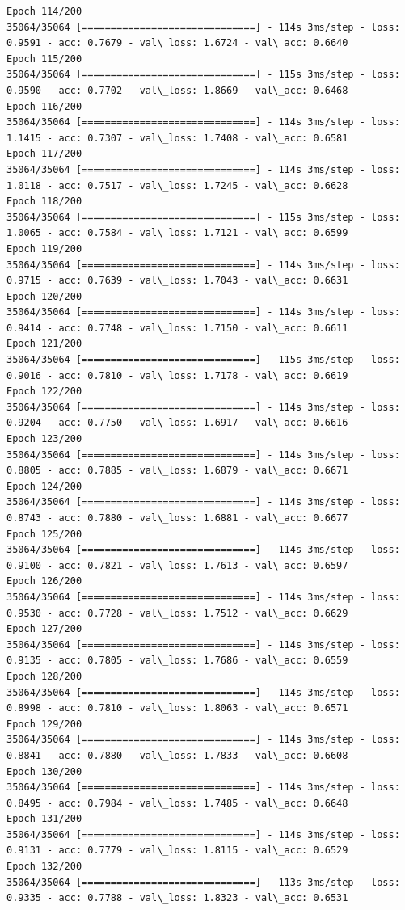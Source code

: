 \documentclass[11pt]{article}
\begin{document}
\begin{Verbatim}[commandchars=\\\{\}]
Epoch 114/200
35064/35064 [==============================] - 114s 3ms/step - loss: 0.9591 - acc: 0.7679 - val\_loss: 1.6724 - val\_acc: 0.6640
Epoch 115/200
35064/35064 [==============================] - 115s 3ms/step - loss: 0.9590 - acc: 0.7702 - val\_loss: 1.8669 - val\_acc: 0.6468
Epoch 116/200
35064/35064 [==============================] - 114s 3ms/step - loss: 1.1415 - acc: 0.7307 - val\_loss: 1.7408 - val\_acc: 0.6581
Epoch 117/200
35064/35064 [==============================] - 114s 3ms/step - loss: 1.0118 - acc: 0.7517 - val\_loss: 1.7245 - val\_acc: 0.6628
Epoch 118/200
35064/35064 [==============================] - 115s 3ms/step - loss: 1.0065 - acc: 0.7584 - val\_loss: 1.7121 - val\_acc: 0.6599
Epoch 119/200
35064/35064 [==============================] - 114s 3ms/step - loss: 0.9715 - acc: 0.7639 - val\_loss: 1.7043 - val\_acc: 0.6631
Epoch 120/200
35064/35064 [==============================] - 114s 3ms/step - loss: 0.9414 - acc: 0.7748 - val\_loss: 1.7150 - val\_acc: 0.6611
Epoch 121/200
35064/35064 [==============================] - 115s 3ms/step - loss: 0.9016 - acc: 0.7810 - val\_loss: 1.7178 - val\_acc: 0.6619
Epoch 122/200
35064/35064 [==============================] - 114s 3ms/step - loss: 0.9204 - acc: 0.7750 - val\_loss: 1.6917 - val\_acc: 0.6616
Epoch 123/200
35064/35064 [==============================] - 114s 3ms/step - loss: 0.8805 - acc: 0.7885 - val\_loss: 1.6879 - val\_acc: 0.6671
Epoch 124/200
35064/35064 [==============================] - 114s 3ms/step - loss: 0.8743 - acc: 0.7880 - val\_loss: 1.6881 - val\_acc: 0.6677
Epoch 125/200
35064/35064 [==============================] - 114s 3ms/step - loss: 0.9100 - acc: 0.7821 - val\_loss: 1.7613 - val\_acc: 0.6597
Epoch 126/200
35064/35064 [==============================] - 114s 3ms/step - loss: 0.9530 - acc: 0.7728 - val\_loss: 1.7512 - val\_acc: 0.6629
Epoch 127/200
35064/35064 [==============================] - 114s 3ms/step - loss: 0.9135 - acc: 0.7805 - val\_loss: 1.7686 - val\_acc: 0.6559
Epoch 128/200
35064/35064 [==============================] - 114s 3ms/step - loss: 0.8998 - acc: 0.7810 - val\_loss: 1.8063 - val\_acc: 0.6571
Epoch 129/200
35064/35064 [==============================] - 114s 3ms/step - loss: 0.8841 - acc: 0.7880 - val\_loss: 1.7833 - val\_acc: 0.6608
Epoch 130/200
35064/35064 [==============================] - 114s 3ms/step - loss: 0.8495 - acc: 0.7984 - val\_loss: 1.7485 - val\_acc: 0.6648
Epoch 131/200
35064/35064 [==============================] - 114s 3ms/step - loss: 0.9131 - acc: 0.7779 - val\_loss: 1.8115 - val\_acc: 0.6529
Epoch 132/200
35064/35064 [==============================] - 113s 3ms/step - loss: 0.9335 - acc: 0.7788 - val\_loss: 1.8323 - val\_acc: 0.6531

\end{Verbatim}
\end{document}
